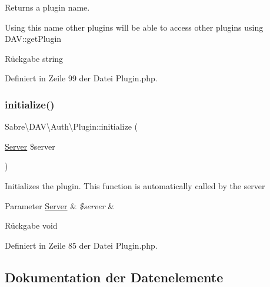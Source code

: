 Returns a plugin name.

Using this name other plugins will be able to access other plugins using D\+AV\+::get\+Plugin

\begin{DoxyReturn}{Rückgabe}
string 
\end{DoxyReturn}


Definiert in Zeile 99 der Datei Plugin.\+php.

\mbox{\label{class_sabre_1_1_d_a_v_1_1_auth_1_1_plugin_a2bce3a74a48f0c4f1bc3301fb2b619d1}} 
\subsubsection{\texorpdfstring{initialize()}{initialize()}}
{\footnotesize\ttfamily Sabre\textbackslash{}\+D\+A\+V\textbackslash{}\+Auth\textbackslash{}\+Plugin\+::initialize (\begin{DoxyParamCaption}\item[{\mbox{\hyperlink{class_sabre_1_1_d_a_v_1_1_server}{Server}}}]{\$server }\end{DoxyParamCaption})}

Initializes the plugin. This function is automatically called by the server


\begin{DoxyParams}[1]{Parameter}
\mbox{\hyperlink{class_sabre_1_1_d_a_v_1_1_server}{Server}} & {\em \$server} & \\
\hline
\end{DoxyParams}
\begin{DoxyReturn}{Rückgabe}
void 
\end{DoxyReturn}


Definiert in Zeile 85 der Datei Plugin.\+php.



\subsection{Dokumentation der Datenelemente}
\mbox{\label{class_sabre_1_1_d_a_v_1_1_auth_1_1_plugin_af88c5506e0997d4d1604b278f6edbf88}} 
